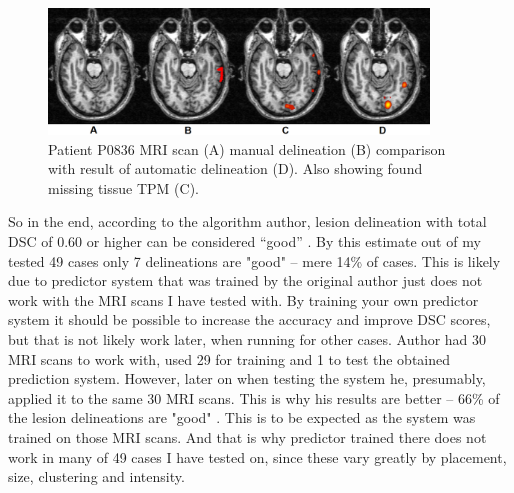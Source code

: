 \documentclass[12pt]{article}
\begin{document}
\begin{figure}[!htb]
\centering
\includegraphics[width=0.9\textwidth]{img/javaw_2017-01-27_14-04-52}
\caption{Patient P0836 MRI scan (A) manual delineation (B) comparison with result of automatic delineation (D). Also showing found missing tissue TPM (C).}
\label{fig:0836defaultDelineation}
\end{figure}

So in the end, according to the algorithm author, lesion delineation with total DSC of 0.60 or higher can be considered “good” \cite{griffis2016voxel}. By this estimate out of my tested 49 cases only 7 delineations are "good" – mere 14\% of cases. This is likely due to predictor system that was trained by the original author just does not work with the MRI scans I have tested with. By training your own predictor system it should be possible to increase the accuracy and improve DSC scores, but that is not likely work later, when running for other cases. Author had 30 MRI scans to work with, used 29 for training and 1 to test the obtained prediction system. However, later on when testing the system he, presumably, applied it to the same 30 MRI scans. This is why his results are better – 66\% of the lesion delineations are "good" \cite{griffis2016voxel}. This is to be expected as the system was trained on those MRI scans. And that is why predictor trained there does not work in many of 49 cases I have tested on, since these vary greatly by placement, size, clustering and intensity.
\end{document}
